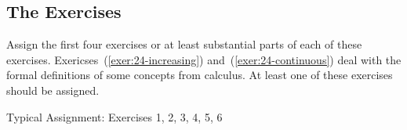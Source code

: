 \hbreak


\subsection*{The Exercises}

Assign the first four exercises or at least substantial parts of each of these exercises.  Exericses~(\ref{exer:24-increasing}) and~(\ref{exer:24-continuous}) deal with the formal definitions of some concepts from calculus.  At least one of these exercises should be assigned.

\vskip6pt
\noindent
Typical Assignment:  Exercises 1, 2, 3, 4, 5, 6
\hbreak
\endinput
